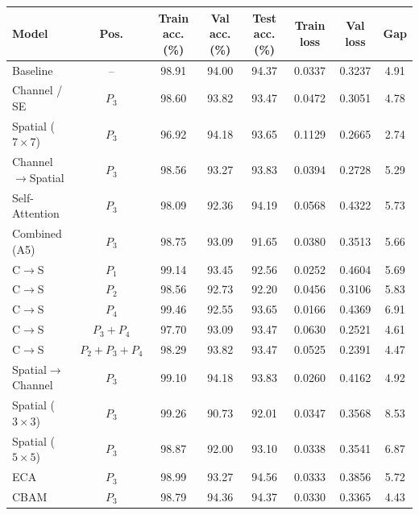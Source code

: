 \documentclass[11pt]{article}
\begin{document}
\begin{center}
\small
\setlength{\tabcolsep}{4pt}
\begin{tabular}{|l|c|c|c|c|c|c|c|}
\hline
Model & Pos. & Train acc. (\%) & Val acc. (\%) & Test acc. (\%) & Train loss & Val loss & Gap\\
\hline
Baseline & -- & 98.91 & 94.00 & 94.37 & 0.0337 & 0.3237 & 4.91\\
Channel / SE & $P_3$ & 98.60 & 93.82 & 93.47 & 0.0472 & 0.3051 & 4.78\\
Spatial ($7{\times}7$) & $P_3$ & 96.92 & 94.18 & 93.65 & 0.1129 & 0.2665 & 2.74\\
Channel$\rightarrow$Spatial & $P_3$ & 98.56 & 93.27 & 93.83 & 0.0394 & 0.2728 & 5.29\\
Self-Attention & $P_3$ & 98.09 & 92.36 & 94.19 & 0.0568 & 0.4322 & 5.73\\
Combined (A5) & $P_3$ & 98.75 & 93.09 & 91.65 & 0.0380 & 0.3513 & 5.66\\
C$\rightarrow$S & $P_1$ & 99.14 & 93.45 & 92.56 & 0.0252 & 0.4604 & 5.69\\
C$\rightarrow$S & $P_2$ & 98.56 & 92.73 & 92.20 & 0.0456 & 0.3106 & 5.83\\
C$\rightarrow$S & $P_4$ & 99.46 & 92.55 & 93.65 & 0.0166 & 0.4369 & 6.91\\
C$\rightarrow$S & $P_3{+}P_4$ & 97.70 & 93.09 & 93.47 & 0.0630 & 0.2521 & 4.61\\
C$\rightarrow$S & $P_2{+}P_3{+}P_4$ & 98.29 & 93.82 & 93.47 & 0.0525 & 0.2391 & 4.47\\
Spatial$\rightarrow$Channel & $P_3$ & 99.10 & 94.18 & 93.83 & 0.0260 & 0.4162 & 4.92\\
Spatial ($3{\times}3$) & $P_3$ & 99.26 & 90.73 & 92.01 & 0.0347 & 0.3568 & 8.53\\
Spatial ($5{\times}5$) & $P_3$ & 98.87 & 92.00 & 93.10 & 0.0338 & 0.3541 & 6.87\\
ECA & $P_3$ & 98.99 & 93.27 & 94.56 & 0.0333 & 0.3856 & 5.72\\
CBAM & $P_3$ & 98.79 & 94.36 & 94.37 & 0.0330 & 0.3365 & 4.43\\
\hline
\end{tabular}
\end{center}
\end{document}
